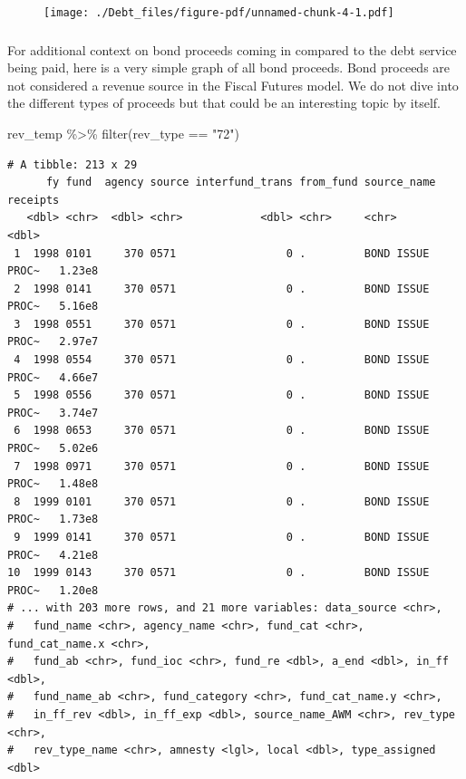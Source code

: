 \documentclass[
  letterpaper,
  DIV=11,
  numbers=noendperiod]{scrreport}
\newenvironment{Shaded}{\begin{snugshade}}{\end{snugshade}}
\newcommand{\FunctionTok}[1]{\textcolor[rgb]{0.28,0.35,0.67}{#1}}
\newcommand{\NormalTok}[1]{\textcolor[rgb]{0.00,0.23,0.31}{#1}}
\newcommand{\SpecialCharTok}[1]{\textcolor[rgb]{0.37,0.37,0.37}{#1}}
\newcommand{\StringTok}[1]{\textcolor[rgb]{0.13,0.47,0.30}{#1}}
\begin{document}
\begin{figure}[H]

{\centering \texttt{[image: ./Debt\_files/figure-pdf/unnamed-chunk-4-1.pdf]}

}

\end{figure}

\hypertarget{section-1}{%
\subsubsection{}\label{section-1}}

For additional context on bond proceeds coming in compared to the debt
service being paid, here is a very simple graph of all bond proceeds.
Bond proceeds are not considered a revenue source in the Fiscal Futures
model. We do not dive into the different types of proceeds but that
could be an interesting topic by itself.

\begin{Shaded}
\begin{Highlighting}[]
\NormalTok{rev\_temp }\SpecialCharTok{\%\textgreater{}\%} 
  \FunctionTok{filter}\NormalTok{(rev\_type }\SpecialCharTok{==} \StringTok{"72"}\NormalTok{)}
\end{Highlighting}
\end{Shaded}

\begin{verbatim}
# A tibble: 213 x 29
      fy fund  agency source interfund_trans from_fund source_name      receipts
   <dbl> <chr>  <dbl> <chr>            <dbl> <chr>     <chr>               <dbl>
 1  1998 0101     370 0571                 0 .         BOND ISSUE PROC~   1.23e8
 2  1998 0141     370 0571                 0 .         BOND ISSUE PROC~   5.16e8
 3  1998 0551     370 0571                 0 .         BOND ISSUE PROC~   2.97e7
 4  1998 0554     370 0571                 0 .         BOND ISSUE PROC~   4.66e7
 5  1998 0556     370 0571                 0 .         BOND ISSUE PROC~   3.74e7
 6  1998 0653     370 0571                 0 .         BOND ISSUE PROC~   5.02e6
 7  1998 0971     370 0571                 0 .         BOND ISSUE PROC~   1.48e8
 8  1999 0101     370 0571                 0 .         BOND ISSUE PROC~   1.73e8
 9  1999 0141     370 0571                 0 .         BOND ISSUE PROC~   4.21e8
10  1999 0143     370 0571                 0 .         BOND ISSUE PROC~   1.20e8
# ... with 203 more rows, and 21 more variables: data_source <chr>,
#   fund_name <chr>, agency_name <chr>, fund_cat <chr>, fund_cat_name.x <chr>,
#   fund_ab <chr>, fund_ioc <chr>, fund_re <dbl>, a_end <dbl>, in_ff <dbl>,
#   fund_name_ab <chr>, fund_category <chr>, fund_cat_name.y <chr>,
#   in_ff_rev <dbl>, in_ff_exp <dbl>, source_name_AWM <chr>, rev_type <chr>,
#   rev_type_name <chr>, amnesty <lgl>, local <dbl>, type_assigned <dbl>
\end{verbatim}
\end{document}
